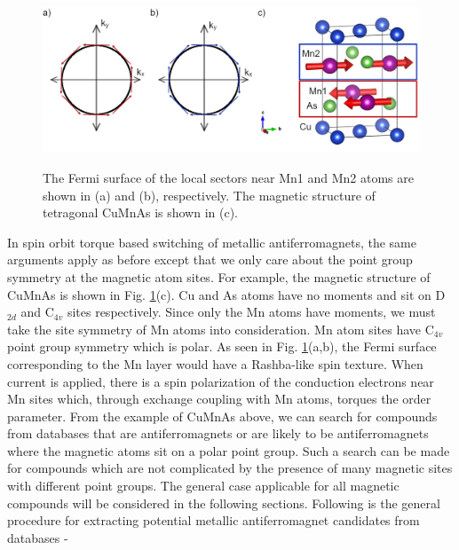 \documentclass[11pt,edeposit,draftthesis]{uiucthesis2020}
\begin{document}
\begin{mainmatter}
\begin{figure}
\centering\includegraphics[width=\columnwidth]{figures/ch2/wadley_1.png} \\
\caption{\label{fig:wadley_1}
The Fermi surface of the local sectors near Mn1 and Mn2 atoms are shown in (a) and (b), respectively. The magnetic structure of tetragonal CuMnAs is shown in (c).
}
\end{figure}


In spin orbit torque based switching of metallic antiferromagnets, the same arguments apply as before except that we only care about the point group symmetry at the magnetic atom sites. For example, the magnetic structure of CuMnAs is shown in Fig. \ref{fig:wadley_1}(c). Cu and As atoms have no moments and sit on D$_{2d}$ and C$_{4v}$ sites respectively. Since only the Mn atoms have moments, we must take the site symmetry of Mn atoms into consideration. Mn atom sites have C$_{4v}$ point group symmetry which is polar. As seen in Fig. \ref{fig:wadley_1}(a,b), the Fermi surface corresponding to the Mn layer would have a Rashba-like spin texture. When current is applied, there is a spin polarization of the conduction electrons near Mn sites  which, through exchange coupling with Mn atoms, torques the order parameter. From the example of CuMnAs above, we can search for compounds from databases that are antiferromagnets or are likely to be antiferromagnets where the magnetic atoms sit on a polar point group. Such a search can be made for compounds which are not complicated by the presence of many magnetic sites with different point groups. The general case applicable for all magnetic compounds will be considered in the following sections. Following is the general procedure for extracting potential metallic antiferromagnet candidates from databases -


\end{mainmatter}
\end{document}
